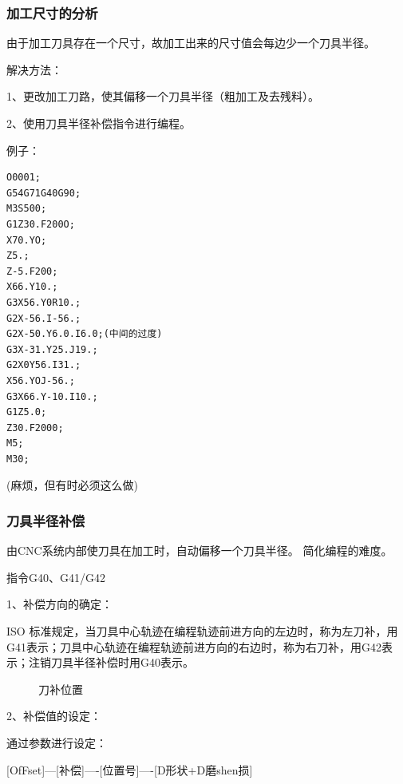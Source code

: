 \subsubsection{加工尺寸的分析}

由于加工刀具存在一个尺寸，故加工出来的尺寸值会每边少一个刀具半径。

解决方法：

1、更改加工刀路，使其偏移一个刀具半径（粗加工及去残料）。

2、使用刀具半径补偿指令进行编程。

例子：

\begin{lstlisting}
O0001;
G54G71G40G90;
M3S500;
G1Z30.F200O;
X70.YO;
Z5.;
Z-5.F200;
X66.Y10.;
G3X56.Y0R10.;
G2X-56.I-56.;
G2X-50.Y6.0.I6.0;(中间的过度)
G3X-31.Y25.J19.;
G2X0Y56.I31.;
X56.YOJ-56.;
G3X66.Y-10.I10.;
G1Z5.0;
Z30.F2000;
M5;
M30;
\end{lstlisting}
(麻烦，但有时必须这么做)


\subsubsection{刀具半径补偿}

由CNC系统内部使刀具在加工时，自动偏移一个刀具半径。
简化编程的难度。

指令G40、G41/G42

1、补偿方向的确定：

ISO 标准规定，当刀具中心轨迹在编程轨迹前进方向的左边时，称为左刀补，用G41表示；刀具中心轨迹在编程轨迹前进方向的右边时，称为右刀补，用G42表示；注销刀具半径补偿时用G40表示。

\begin{figure}[h]
	\centering
    

\caption{刀补位置}
\label{fig:7-1}
\end{figure}

2、补偿值的设定：

通过参数进行设定：

[OfFset]---[补偿]----[位置号]----[D形状+D磨shen损]

